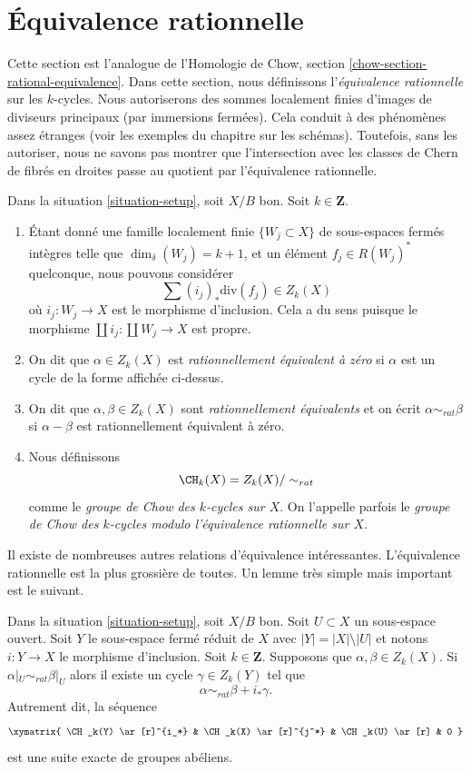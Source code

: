 \section{Équivalence rationnelle}
\label{section-rational-equivalence}

\noindent
Cette section est l'analogue de l'Homologie de Chow, section
\ref{chow-section-rational-equivalence}. Dans cette section, nous définissons
l'{\it équivalence rationnelle} sur les $k$-cycles. Nous autoriserons des
sommes localement finies d'images de diviseurs principaux (par immersions
fermées). Cela conduit à des phénomènes assez étranges (voir les exemples du
chapitre sur les schémas). Toutefois, sans les autoriser, nous ne savons pas
montrer que l'intersection avec les classes de Chern de
fibrés en droites passe au quotient par l'équivalence rationnelle.

\begin{definition}
\label{definition-rational-equivalence}
Dans la situation \ref{situation-setup}, soit $X/B$ bon. Soit $k
\in \mathbf{Z}$.
\begin{enumerate}
\item Étant donné une famille localement finie $\{W_j \subset X\}$ de
sous-espaces fermés intègres telle que $\dim_\delta(W_j) = k + 1$, et un
élément $f_j \in R(W_j)^*$ quelconque, nous pouvons considérer
$$
\sum (i_j)_*\text{div}(f_j) \in Z_k(X)
$$
où $i_j : W_j \to X$ est le morphisme d'inclusion. Cela a du sens puisque le
morphisme $\coprod i_j : \coprod W_j \to X$ est propre.
\item On dit que $\alpha \in Z_k(X)$ est {\it rationnellement équivalent à
zéro} si $\alpha$ est un cycle de la forme affichée ci-dessus.
\item On dit que $\alpha, \beta \in Z_k(X)$ sont {\it rationnellement
équivalents} et on écrit $\alpha \sim_{rat} \beta$ si $\alpha - \beta$ est
rationnellement équivalent à zéro.
\item Nous définissons
$$
\CH_k(X) = Z_k(X) / \sim_{rat}
$$
comme le {\it groupe de Chow des $k$-cycles sur $X$}. On l'appelle parfois le
{\it groupe de Chow des $k$-cycles modulo l'équivalence rationnelle sur $X$}.
\end{enumerate}
\end{definition}

\noindent
Il existe de nombreuses autres relations d'équivalence intéressantes.
L'équivalence rationnelle est la plus grossière de toutes. Un lemme très
simple mais important est le suivant.

\begin{lemma}
\label{lemma-restrict-to-open}
Dans la situation \ref{situation-setup}, soit $X/B$ bon. Soit $U
\subset X$ un sous-espace ouvert. Soit $Y$ le sous-espace fermé réduit de $X$
avec $|Y| = |X| \setminus |U|$ et notons $i : Y \to X$ le morphisme
d'inclusion. Soit $k \in \mathbf{Z}$. Supposons que $\alpha, \beta \in
Z_k(X)$. Si $\alpha|_U \sim_{rat} \beta|_U$ alors il existe un cycle $\gamma
\in Z_k(Y)$ tel que
$$
\alpha \sim_{rat} \beta + i_*\gamma.
$$
Autrement dit, la séquence
$$
\xymatrix{
\CH_k(Y) \ar[r]^{i_*} & \CH_k(X) \ar[r]^{j^*} & \CH_k(U) \ar[r] & 0
}
$$
est une suite exacte de groupes abéliens.
\end{lemma}

